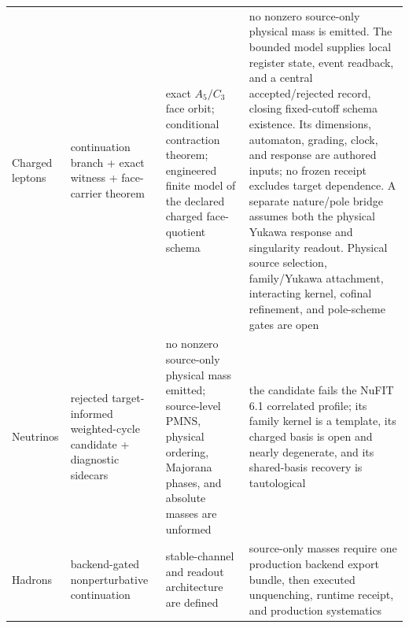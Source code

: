 \begin{longtable}{@{}>{\raggedright\arraybackslash}p{}>{\raggedright\arraybackslash}p{}>{\raggedright\arraybackslash}p{}>{\raggedright\arraybackslash}p{}@{}}
Charged leptons & continuation branch + exact witness + face-carrier theorem & exact \(A_5/C_3\) face orbit; conditional contraction theorem; engineered finite model of the declared charged face-quotient schema & no nonzero source-only physical mass is emitted. The bounded model supplies local register state, event readback, and a central accepted/rejected record, closing fixed-cutoff schema existence. Its dimensions, automaton, grading, clock, and response are authored inputs; no frozen receipt excludes target dependence. A separate nature/pole bridge assumes both the physical Yukawa response and singularity readout. Physical source selection, family/Yukawa attachment, interacting kernel, cofinal refinement, and pole-scheme gates are open \\
Neutrinos & rejected target-informed weighted-cycle candidate + diagnostic sidecars & no nonzero source-only physical mass emitted; source-level PMNS, physical ordering, Majorana phases, and absolute masses are unformed & the candidate fails the NuFIT 6.1 correlated profile; its family kernel is a template, its charged basis is open and nearly degenerate, and its shared-basis recovery is tautological \\
Hadrons & backend-gated nonperturbative continuation & stable-channel and readout architecture are defined & source-only masses require one production backend export bundle, then executed unquenching, runtime receipt, and production systematics \\
\end{longtable}
\normalsize

